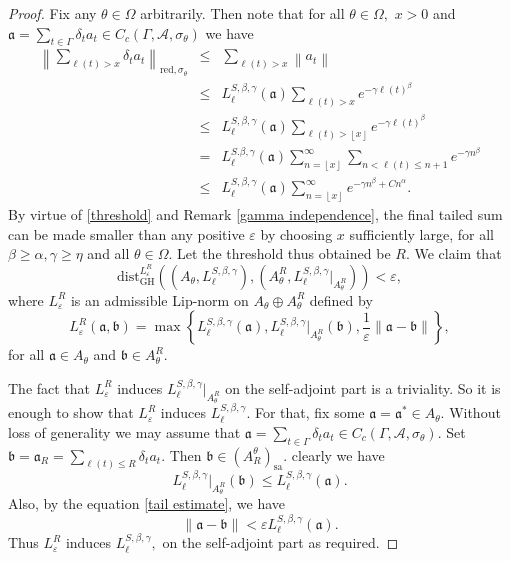\documentclass[a4paper,11pt,reqno]{amsart}
\theoremstyle{plain}
\theoremstyle{mainthmstyle}
\theoremstyle{named}
\numberwithin{equation}{section}
\newcommand{\bea}{\begin{eqnarray}}
\newcommand{\eea}{\end{eqnarray}}
\begin{document}
\begin{proof}
Fix any $\theta \in \Omega$ arbitrarily. Then note that for all $\theta \in \Omega,$ $x > 0$ and $\mathfrak {a} = \sum\limits_{t \in \Gamma} \delta_t a_t \in C_c \left (\Gamma, \mathcal A, \sigma_{\theta} \right )$ we have 
\bea
\left \|\sum\limits_{\ell (t) > x} \delta_t a_t \right \|_{\mathrm {red}, \sigma_{\theta}} & \leq & \sum\limits_{\ell (t) > x} \left \|a_t \right \| \nonumber \\ & \leq & L_{\ell}^{S, \beta, \gamma} (\mathfrak {a}) \sum\limits_{\ell (t) > x} e^{-\gamma \ell (t)^{\beta}} \nonumber \\ & \leq & L_{\ell}^{S, \beta, \gamma} (\mathfrak {a}) \sum\limits_{\ell (t) > \left \lfloor x \right \rfloor} e^{- \gamma \ell (t)^{\beta}} \nonumber \\ & = & L_{\ell}^{S. \beta, \gamma} (\mathfrak {a}) \sum\limits_{n = \left \lfloor x \right \rfloor}^{\infty} \sum\limits_{n < \ell (t) \leq n + 1} e^{-\gamma n^{\beta}} \nonumber \\ & \leq & \label{tail estimate} L_{\ell}^{S, \beta, \gamma} (\mathfrak {a}) \sum\limits_{n = \left \lfloor x \right \rfloor}^{\infty} e^{-\gamma n^{\beta} + C n^{\alpha}}. \label{tail estimation}
\eea
By virtue of \ref{threshold} and Remark \ref{gamma independence}, the final tailed sum can be made smaller than any positive $\varepsilon$ by choosing $x$ sufficiently large, for all $\beta\geq\alpha,\gamma\geq\eta$ and  all $\theta \in \Omega.$ Let the threshold thus obtained be $R.$ We claim that
$$\mathrm {dist}_{\mathrm {GH}}^{L_{\varepsilon}^{R}} \left (\left (A_{\theta}, L_{\ell}^{S, \beta, \gamma} \right ), \left (A_{\theta}^{R}, L_{\ell}^{S, \beta, \gamma} \big \rvert_{A_{\theta}^{R}} \right ) \right ) < \varepsilon,$$
where $L_{\varepsilon}^{R}$ is an admissible Lip-norm on $A_{\theta} \oplus A_{\theta}^{R}$ defined by
$$L_{\varepsilon}^{R} (\mathfrak {a}, \mathfrak {b}) = \max \left \{L_{\ell}^{S, \beta, \gamma} (\mathfrak {a}), L_{\ell}^{S, \beta, \gamma} \big \rvert_{A_{\theta}^{R}} (\mathfrak {b}), \frac {1} {\varepsilon} \|\mathfrak {a} - \mathfrak {b}\| \right \},$$ for all $\mathfrak {a} \in A_{\theta}$ and $\mathfrak {b} \in A_{\theta}^{R}.$ 

The fact that $L_{\varepsilon}^{R}$ induces  $L_{\ell}^{S, \beta, \gamma} \big \rvert_{A_{\theta}^{R}}$ on the self-adjoint part is a triviality. So it is enough to show that $L_{\varepsilon}^{R}$ induces $L_{\ell}^{S, \beta, \gamma}.$ For that, fix some $\mathfrak{a}=\mathfrak{a}^{\ast} \in A_{\theta}.$ Without loss of generality we may assume that $\mathfrak {a} = \sum\limits_{t \in \Gamma} \delta_t a_t \in C_c \left (\Gamma, \mathcal A, \sigma_{\theta} \right ).$ Set $\mathfrak {b} = \mathfrak {a}_R = \sum\limits_{\ell (t) \leq R} \delta_t a_t.$ Then $\mathfrak{b}\in (A_{R}^{\theta})_{\mathrm{sa}}$. clearly we have
$$L_{\ell}^{S, \beta, \gamma} \big \rvert_{A_{\theta}^{R}} (\mathfrak {b}) \leq L_{\ell}^{S, \beta, \gamma} (\mathfrak {a}).$$
Also, by the equation \eqref{tail estimate}, we have 
$$\|\mathfrak {a} - \mathfrak {b}\| < \varepsilon L_{\ell}^{S, \beta, \gamma} (\mathfrak {a}).$$
Thus $L_{\varepsilon}^{R}$ induces $L_{\ell}^{S, \beta, \gamma},$ on the self-adjoint part as required.


\end{proof}
\end{document}
